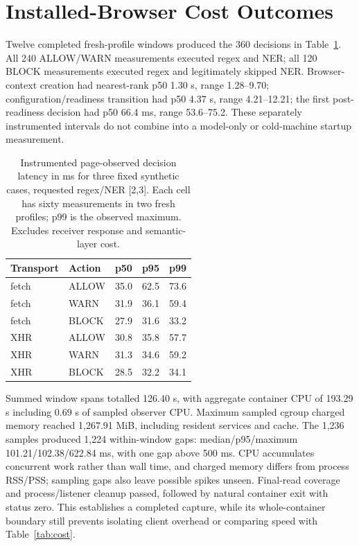 \documentclass[conference]{IEEEtran}
\begin{document}
\section{Installed-Browser Cost Outcomes}
\label{app:browser_cost}
Twelve completed fresh-profile windows produced the 360 decisions in Table~\ref{tab:browser_cost}. All 240 ALLOW/WARN measurements executed regex and NER; all 120 BLOCK measurements executed regex and legitimately skipped NER. Browser-context creation had nearest-rank p50 1.30 s, range 1.28--9.70; configuration/readiness transition had p50 4.37 s, range 4.21--12.21; the first post-readiness decision had p50 66.4 ms, range 53.6--75.2. These separately instrumented intervals do not combine into a model-only or cold-machine startup measurement.

\begin{table}[H]
\centering
\caption{Instrumented page-observed decision latency in ms for three fixed synthetic cases, requested regex/NER [2,3]. Each cell has sixty measurements in two fresh profiles; p99 is the observed maximum. Excludes receiver response and semantic-layer cost.}
\label{tab:browser_cost}
\small
\begin{tabular}{llrrr}
\toprule
Transport & Action & p50 & p95 & p99 \\
\midrule
fetch &ALLOW &35.0 &62.5 &73.6 \\
fetch &WARN &31.9 &36.1 &59.4 \\
fetch &BLOCK &27.9 &31.6 &33.2 \\
XHR &ALLOW &30.8 &35.8 &57.7 \\
XHR &WARN &31.3 &34.6 &59.2 \\
XHR &BLOCK &28.5 &32.2 &34.1 \\
\bottomrule
\end{tabular}
\end{table}

Summed window spans totalled 126.40 s, with aggregate container CPU of 193.29 s including 0.69 s of sampled observer CPU. Maximum sampled cgroup charged memory reached 1,267.91 MiB, including resident services and cache. The 1,236 samples produced 1,224 within-window gaps: median/p95/maximum 101.21/102.38/622.84 ms, with one gap above 500 ms. CPU accumulates concurrent work rather than wall time, and charged memory differs from process RSS/PSS; sampling gaps also leave possible spikes unseen. Final-read coverage and process/listener cleanup passed, followed by natural container exit with status zero. This establishes a completed capture, while its whole-container boundary still prevents isolating client overhead or comparing speed with Table~\ref{tab:cost}.
\end{document}
